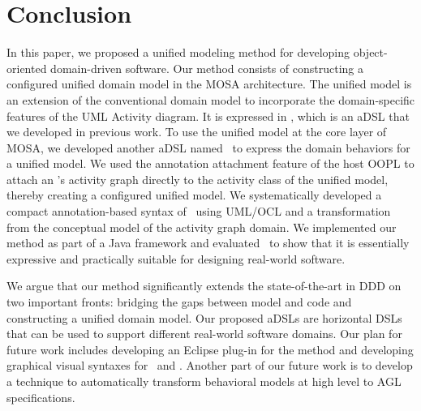 %
\section{Conclusion}\label{sect:conclusion} %
In this paper, we proposed a unified modeling method for developing object-oriented domain-driven software. Our method consists of constructing a configured unified domain model in the MOSA architecture. The unified model is an extension of the conventional domain model to incorporate the domain-specific features of the UML Activity diagram. It is expressed in \dcsl, which is an aDSL that we developed in previous work. To use the unified model at the core layer of MOSA, we developed another aDSL named \agl~to express the domain behaviors for a unified model. We used the annotation attachment feature of the host OOPL to attach an \agl's activity graph directly to the activity class of the unified model, thereby creating a configured unified model.
We systematically developed a compact annotation-based syntax of \agl~using UML/OCL and a transformation from the conceptual model of the activity graph domain.
%
We implemented our method as part of a Java framework and evaluated \agl~to show that it is essentially expressive and practically suitable for designing real-world software. 

We argue that our method significantly extends the state-of-the-art in DDD on two important fronts: bridging the gaps between model and code and constructing a unified domain model. Our proposed aDSLs are horizontal DSLs that can be used to support different real-world software domains.
%
Our plan for future work includes
developing an Eclipse plug-in for the method and developing graphical visual syntaxes for \dcsl~and \agl. Another part of our future work is to develop a technique to automatically transform behavioral models at high level to AGL specifications. 
